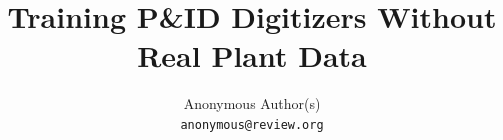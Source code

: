 \documentclass[10pt,twocolumn,letterpaper]{article}
\begin{document}
\title{Training P\&ID Digitizers Without Real Plant Data}

\author{
    Anonymous Author(s)\\
    {\tt\small anonymous@review.org}
}

\maketitle










{\small


}
\end{document}
